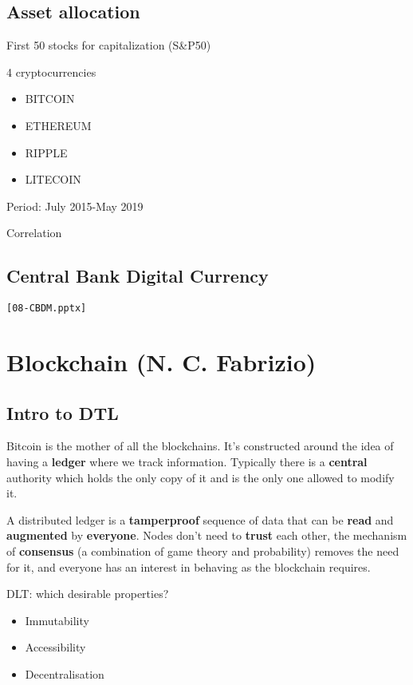 
\section{Asset allocation}

First 50 stocks for capitalization (S\&P50)

4 cryptocurrencies
\begin{itemize}
	\item BITCOIN
	\item ETHEREUM
	\item RIPPLE
	\item LITECOIN
\end{itemize}

Period: July 2015-May 2019


Correlation


\section{Central Bank Digital Currency}

\texttt{[08-CBDM.pptx]}

\chapter{Blockchain (N. C. Fabrizio)}

\section{Intro to DTL}

Bitcoin is the mother of all the blockchains. It's constructed around the idea of having a \textbf{ledger} where we track information. Typically there is a \textbf{central} authority which holds the only copy of it and is the only one allowed to modify it.

A distributed ledger is a \textbf{tamperproof} sequence of data that can be \textbf{read} and \textbf{augmented} by \textbf{everyone}. Nodes don't need to \textbf{trust} each other, the mechanism of \textbf{consensus} (a combination of game theory and probability) removes the need for it, and everyone has an interest in behaving as the blockchain requires. 

DLT: which desirable properties?
\begin{itemize}
	\item Immutability
	\item Accessibility
	\item Decentralisation
\end{itemize}

